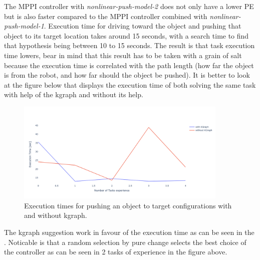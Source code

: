 The \ac{MPPI} controller with \textit{nonlinear-push-model-2} does not only have a lower \ac{PE} but is also faster compared to the \ac{MPPI} controller combined with \textit{nonlinear-push-model-1}. Execution time for driving toward the object and pushing that object to its target location takes around 15 seconds, with a search time to find that hypothesis being between 10 to 15 seconds. The result is that task execution time lowers, bear in mind that this result has to be taken with a grain of salt because the execution time is correlated with the path length (how far the object is from the robot, and how far should the object be pushed). It is better to look at the figure below that displays the execution time of both solving the same task with help of the \ac{kgraph} and without its help.

\begin{figure}[H]
    \centering
    \includegraphics[width=0.9\textwidth]{figures/results/random_push_with_without_kgraph}
    \caption{Execution times for pushing an object to target configurations with and without \ac{kgraph}.}%
    \label{fig:random_push_with_without_kgraph}
\end{figure}

The \ac{kgraph} suggestion work in favour of the execution time as can be seen in the . Noticable is that a random selection by pure change selects the best choice of the controller as can be seen in 2 tasks of experience in the figure above.

%
%
%

